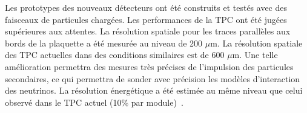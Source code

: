 \documentclass[../main.tex]{subfiles}
\begin{document}

Les prototypes des nouveaux détecteurs ont été construits et testés avec des faisceaux de particules chargées. Les performances de la TPC ont été jugées supérieures aux attentes. La résolution spatiale pour les traces parallèles aux bords de la plaquette a été mesurée au niveau de 200 $\mu$m. La résolution spatiale des TPC actuelles dans des conditions similaires est de 600 $\mu$m. Une telle amélioration permettra des mesures très précises de l'impulsion des particules secondaires, ce qui permettra de sonder avec précision les modèles d'interaction des neutrinos. La résolution énergétique a été estimée au même niveau que celui observé dans le TPC actuel (10\% par module)~\cite{Attie2019b}.

\end{document}
